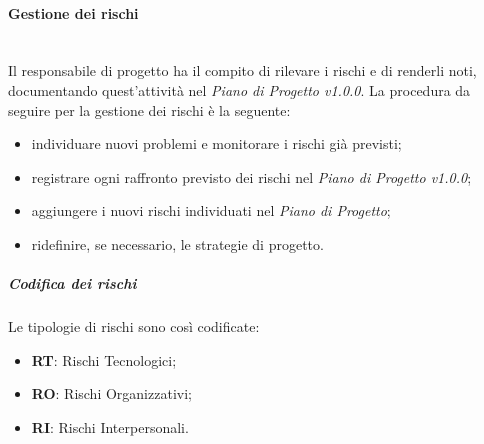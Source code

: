 			\paragraph{Gestione dei rischi} \mbox{}\\
			Il responsabile di progetto ha il compito di rilevare i rischi e di renderli noti, documentando quest'attività nel \textit{Piano di Progetto v1.0.0}. La procedura da seguire per la gestione dei rischi è la seguente:
			\begin{itemize}
				\item individuare nuovi problemi e monitorare i rischi già previsti;
				\item registrare ogni raffronto previsto dei rischi nel \textit{Piano di Progetto v1.0.0};
				\item aggiungere i nuovi rischi individuati nel \textit{Piano di Progetto};
				\item ridefinire, se necessario, le strategie di progetto.
			\end{itemize}
				\subparagraph{Codifica dei rischi}
				Le tipologie di rischi sono così codificate:
				\begin{itemize}
					\item \textbf{RT}: Rischi Tecnologici;
					\item \textbf{RO}: Rischi Organizzativi;
					\item \textbf{RI}: Rischi Interpersonali.
				\end{itemize}
			\begin{comment}
				\paragraph{Gestione di progetto}
				Per suddividersi le attività e per assicurarsi che vengano svolte entro una deadline si è scelto di utilizzare Trello. Questo permette di assegnare una specifica attività ad un membro e impostare anche una scadenza entro la quale l'attività dovrà essere terminata. Sarà il responsabile a gestire la suddivisione degli incarichi tra i membri e a determinare le scadenze per queste.
			\end{comment}

